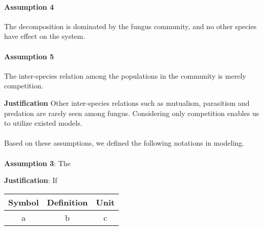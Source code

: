 \paragraph{Assumption 4} The decomposition is dominated by the fungus community, and no other species have effect on the system.

\paragraph{Assumption 5} The inter-species relation among the populations in the community is merely competition.

\textbf{Justification} Other inter-species relations such as mutualism, parasitism and predation are rarely seen among fungus. Considering only competition enables us to utilize existed models.

\paragraph{}
Based on these assumptions, we defined the following notations in modeling.

\paragraph{}
\textbf{Assumption 3}: The

\textbf{Justification}: If

\begin{center}\begin{tabular}{ccc}
    \toprule
    Symbol & Definition & Unit \\
    \midrule
    a & b & c \\
    \bottomrule
\end{tabular}\end{center}